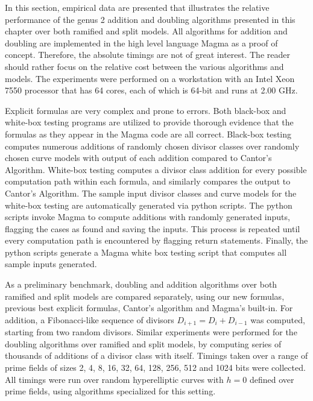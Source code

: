 In this section, empirical data are presented that illustrates the relative
performance of the genus 2 addition and doubling algorithms presented in this
chapter over both ramified and split models. All algorithms for addition and
doubling are implemented in the high level language Magma as a proof of concept.
Therefore, the absolute timings are not of great interest. The reader should
rather focus on the relative cost between the various algorithms and models. The
experiments were performed on a workstation with an Intel Xeon 7550 processor
that has 64 cores, each of which is 64-bit and runs at 2.00 GHz.

Explicit formulas are very complex and prone to errors. Both black-box
and white-box testing programs are utilized to provide thorough evidence that
the formulas as they appear in the Magma code are all correct. Black-box testing
computes numerous additions of randomly chosen divisor classes over randomly
chosen curve models with output of each addition compared to Cantor's Algorithm.
White-box testing computes a divisor class addition for every possible
computation path within each formula, and similarly compares the output to
Cantor's Algorithm. The sample input divisor classes and curve models for the
white-box testing are automatically generated via python scripts. The python
scripts invoke Magma to compute additions with randomly generated inputs,
flagging the cases as found and saving the inputs. This process is repeated
until every computation path is encountered by flagging return statements.
Finally, the python scripts generate a Magma white box testing script that
computes all sample inputs generated.

As a preliminary benchmark, doubling and addition algorithms over both ramified
and split models are compared separately, using our new formulas, previous best
explicit formulas, Cantor's algorithm and Magma's built-in. For addition, a
Fibonacci-like sequence of divisors $D_{i+1} = D_{i} + D_{i-1}$ was computed,
starting from two random divisors. Similar experiments were performed for the
doubling algorithms over ramified and split models, by computing series of
thousands of additions of a divisor class with itself. Timings taken over a
range of prime fields of sizes 2, 4, 8, 16, 32, 64, 128, 256, 512 and 1024 bits
were collected. All timings were run over random hyperelliptic curves with $h=0$
defined over prime fields, using algorithms specialized for this setting.

